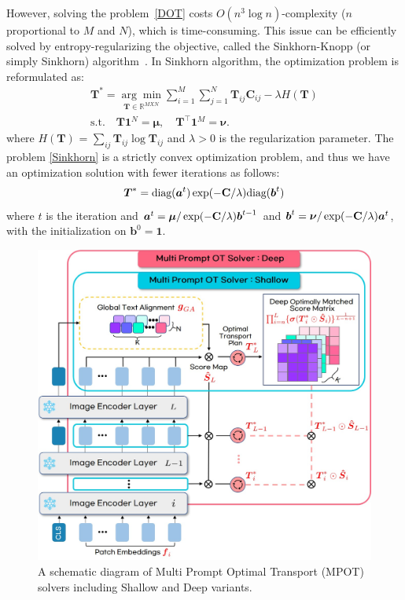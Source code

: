 \documentclass[nohyperref]{article}
\newcommand{\bs}{\boldsymbol}
\theoremstyle{plain}
\theoremstyle{definition}
\theoremstyle{remark}
\begin{document}
However, solving the problem~\eqref{DOT} costs $O(n^3\log n)$-complexity ($n$ proportional to $M$ and $N$), which is time-consuming. 
This issue can be efficiently solved by entropy-regularizing the objective, called the Sinkhorn-Knopp (or simply Sinkhorn) algorithm~\cite{cuturi2013sinkhorn}. In
Sinkhorn algorithm, the optimization problem is reformulated as:
\begin{eqnarray}
\bs{T}^{\ast} = \underset{\bs{T}\in \mathbb{R}^{MXN}}{\arg{\min}} \sum^{M}_{i=1}\sum^{N}_{j=1}\bs{T}_{ij}\bs{C}_{ij} - \lambda H(\bs{T}) \nonumber \\ \textrm{s.t.} \quad \bs{T}\bs{1}^{N} = \bs{\mu}, \quad \bs{T}^{\top}\bs{1}^{M} = \bs{\nu} .
\label{Sinkhorn}
\end{eqnarray}
where $H(\bs{T})$ = $\sum_{ij} \bs{T}_{ij} \log \bs{T}_{ij}$ and $\lambda > 0$ is the regularization parameter.
The problem \eqref{Sinkhorn} is a strictly convex optimization problem, and thus we have an optimization solution with fewer iterations as follows: %
\begin{eqnarray}
\bs{T}^{\ast} = \text{diag}(\bs{a}^{t})\exp(-\bold{C}/\lambda)\text{diag}(\bs{b}^{t})
\label{Sinkhorn2}
\end{eqnarray}
where $t$ is the iteration and $\bs{a}^t = \bs{\mu}/ \exp(-\bold{C}/\lambda)\bs{b}^{t-1}$ and $\bs{b}^{t} = \bs{\nu}/\exp(-\bold{C}/\lambda)\bs{a}^{t}$, with the initialization on $\bs{b}^{0}=\bs{1}$.



\begin{figure}[t]
\vskip 0.1in
\begin{center}
\includegraphics[width=0.95\linewidth]{fig/OT.jpg}
\caption{A schematic diagram of Multi Prompt Optimal Transport (MPOT) solvers including Shallow and Deep variants.}
\label{ot-solver}
\end{center}
\vskip -0.1in
\end{figure}
\end{document}

